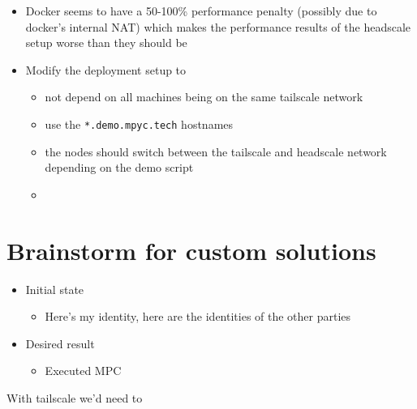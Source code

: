 \begin{itemize}
\tightlist
\item
  Docker seems to have a 50-100\% performance penalty (possibly due to
  docker's internal NAT) which makes the performance results of the
  headscale setup worse than they should be
\item
  Modify the deployment setup to

  \begin{itemize}
  \tightlist
  \item
    not depend on all machines being on the same tailscale network
  \item
    use the \texttt{*.demo.mpyc.tech} hostnames
  \item
    the nodes should switch between the tailscale and headscale network
    depending on the demo script
  \item
  \end{itemize}
\end{itemize}

\hypertarget{brainstorm-for-custom-solutions}{%
\chapter{Brainstorm for custom
solutions}\label{brainstorm-for-custom-solutions}}

\begin{itemize}
\tightlist
\item
  Initial state

  \begin{itemize}
  \tightlist
  \item
    Here's my identity, here are the identities of the other parties
  \end{itemize}
\item
  Desired result

  \begin{itemize}
  \tightlist
  \item
    Executed MPC
  \end{itemize}
\end{itemize}

With tailscale we'd need to

